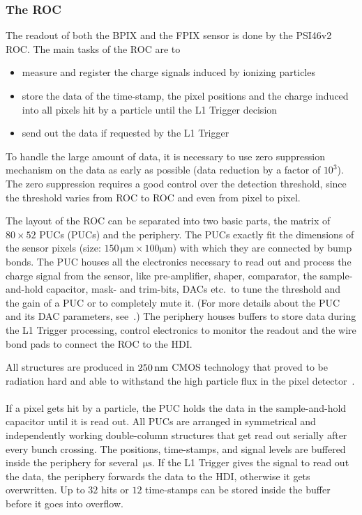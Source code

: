 \subsubsection{The \acl{ROC}}\label{sec:ROC_old}
The readout of both the \acs{BPIX} and the \acs{FPIX} sensor is done by the PSI46v2 \ac{ROC}. The main tasks of the \ac{ROC} are to
\begin{itemize}
\item measure and register the charge signals induced by ionizing particles
\item store the data of the time-stamp, the pixel positions and the charge induced into all pixels hit by a particle until the \ac{L1} Trigger decision
\item send out the data if requested by the \ac{L1} Trigger
\end{itemize}
To handle the large amount of data, it is necessary to use zero suppression mechanism on the data as early as possible (data reduction by a factor of $10^3$). The zero suppression requires a good control over the detection threshold, since the threshold varies from \ac{ROC} to \ac{ROC} and even from pixel to pixel.

The layout of the \ac{ROC} can be separated into two basic parts, the matrix of $80\times 52$ \acl{PUC}s (\acs{PUC}s) and the periphery. The \acs{PUC}s exactly fit the dimensions of the sensor pixels (size: $150\,\si{\micro \meter}\times 100\si{\micro \meter}$) with which they are connected by bump bonds. The \acs{PUC} houses all the electronics necessary to read out and process the charge signal from the sensor, like pre-amplifier, shaper, comparator, the sample-and-hold capacitor, mask- and trim-bits, \ac{DAC}s etc.~to tune the threshold and the gain of a \acs{PUC} or to completely mute it. (For more details about the \acs{PUC} and its \ac{DAC} parameters, see~\cite{Dam09}.) The periphery houses buffers to store data during the \ac{L1} Trigger processing, control electronics to monitor the readout and the wire bond pads to connect the \ac{ROC} to the \ac{HDI}.

All structures are produced in $250\,\rm{nm}$ \ac{CMOS} technology that proved to be radiation hard and able to withstand the high particle flux in the pixel detector~\cite{Dom12}.\\
\\If a pixel gets hit by a particle, the \acs{PUC} holds the data in the sample-and-hold capacitor until it is read out. All \acs{PUC}s are arranged in symmetrical and independently working double-column structures that get read out serially after every bunch crossing. The positions, time-stamps, and signal levels are buffered inside the periphery for several~$\si{\micro \second}$. If the \ac{L1} Trigger gives the signal to read out the data, the periphery forwards the data to the \ac{HDI}, otherwise it gets overwritten. Up to $32$ hits or $12$ time-stamps can be stored inside the buffer before it goes into overflow.

